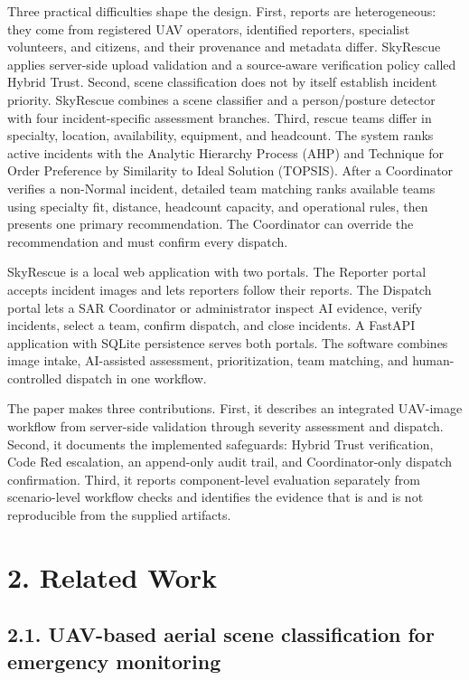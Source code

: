 \documentclass[pdflatex,sn-mathphys-ay]{sn-jnl}
\begin{document}
Three practical difficulties shape the design. First, reports are heterogeneous: they come from registered UAV operators, identified reporters, specialist volunteers, and citizens, and their provenance and metadata differ. SkyRescue applies server-side upload validation and a source-aware verification policy called Hybrid Trust. Second, scene classification does not by itself establish incident priority. SkyRescue combines a scene classifier and a person/posture detector with four incident-specific assessment branches. Third, rescue teams differ in specialty, location, availability, equipment, and headcount. The system ranks active incidents with the Analytic Hierarchy Process (AHP) and Technique for Order Preference by Similarity to Ideal Solution (TOPSIS). After a Coordinator verifies a non-Normal incident, detailed team matching ranks available teams using specialty fit, distance, headcount capacity, and operational rules, then presents one primary recommendation. The Coordinator can override the recommendation and must confirm every dispatch.

SkyRescue is a local web application with two portals. The Reporter portal accepts incident images and lets reporters follow their reports. The Dispatch portal lets a SAR Coordinator or administrator inspect AI evidence, verify incidents, select a team, confirm dispatch, and close incidents. A FastAPI application with SQLite persistence serves both portals. The software combines image intake, AI-assisted assessment, prioritization, team matching, and human-controlled dispatch in one workflow.

The paper makes three contributions. First, it describes an integrated UAV-image workflow from server-side validation through severity assessment and dispatch. Second, it documents the implemented safeguards: Hybrid Trust verification, Code Red escalation, an append-only audit trail, and Coordinator-only dispatch confirmation. Third, it reports component-level evaluation separately from scenario-level workflow checks and identifies the evidence that is and is not reproducible from the supplied artifacts.

\section*{2. Related Work}

\subsection*{2.1. UAV-based aerial scene classification for emergency monitoring}
\end{document}
